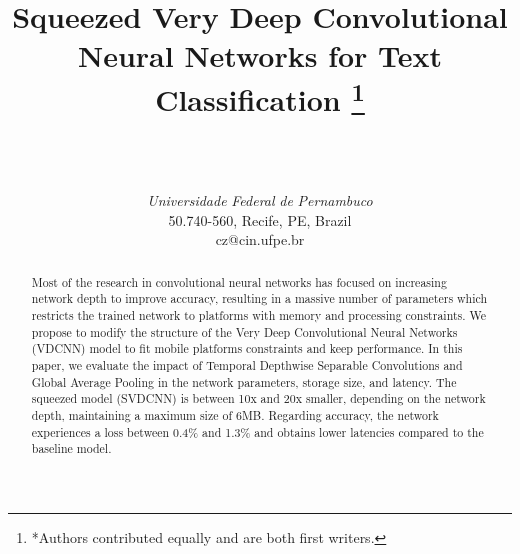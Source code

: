 \documentclass[conference]{IEEEtran}
\begin{document}
\title{Squeezed Very Deep Convolutional Neural Networks for Text Classification
{}
\thanks{*Authors contributed equally and are both first writers.}
}

\author{
\\
\and
{}
\\
\textit{Universidade} \textit{Federal} \textit{de} \textit{Pernambuco}\\
50.740-560, Recife, PE, Brazil\\
cz@cin.ufpe.br
}

\maketitle

\begin{abstract}
Most of the research in convolutional neural networks has focused on increasing network depth to improve accuracy, resulting in a massive number of parameters which restricts the trained network to platforms with memory and processing constraints. We propose to modify the structure of the Very Deep Convolutional Neural Networks (VDCNN) model to fit mobile platforms constraints and keep performance. In this paper, we evaluate the impact of Temporal Depthwise Separable Convolutions and Global Average Pooling in the network parameters, storage size, and latency.  The squeezed model (SVDCNN) is between 10x and 20x smaller, depending on the network depth, maintaining a maximum size of 6MB. Regarding accuracy,  the network experiences a loss between 0.4\% and 1.3\% and obtains lower latencies compared to the baseline model. 

 


\end{abstract}
\end{document}
